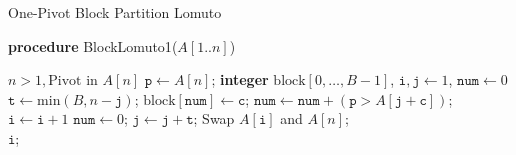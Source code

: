 \documentclass[a4paper,oneside,12pt]{book}
\newcommand\lomutoone{\textsf{BlockLomuto1}}
\begin{document}
\begin{algorithm}[t!]
    \small
    \caption{One-Pivot Block Partition Lomuto}\samepage\label{algo:single:pivot:partitioning}
    \textbf{procedure} \lomutoone($\textit{A}[1..\textit{n}]$)
    \begin{algorithmic}[1]
        \Require $\textit{n} > 1, \text{Pivot in $\textit{A}[\textit{n}]$}$
        \State $\texttt{p} \gets \textit{A}[\textit{n}]$; 
    \State \textbf{integer} $\text{block}[0, \ldots, \textit{B} - 1]$, $\texttt{i}, \texttt{j} \gets 1$, $\texttt{num} \gets 0$
    \State $\texttt{t} \gets \text{min}(\textit{B}, \textit{n} - \texttt{j} )$;
                \State $\text{block}[\texttt{num}] \gets \texttt{c}$;
            \State $\texttt{num} \gets \texttt{num} +  (\texttt{p} > \textit{A}[\texttt{j} + \texttt{c}])$;
            \EndFor
        \State {}
        \State $\texttt{i} \gets \texttt{i} + 1$
            \EndFor
            \State $\texttt{num} \gets 0$;
        \State $\texttt{j} \gets \texttt{j} + \texttt{t}$;
        \EndWhile
        \State Swap $\textit{A}[\texttt{i}]$ and $\textit{A}[\textit{n}]$;\\
    \Return $\texttt{i}$;
    \end{algorithmic}
\end{algorithm}
\end{document}
